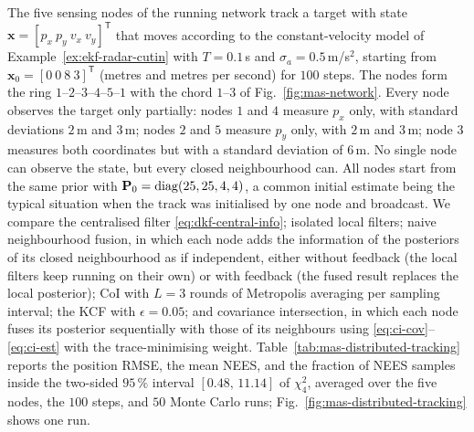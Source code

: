 \begin{example}
\label{ex:mas-distributed-tracking}
The five sensing nodes of the running network track a target with state $\mathbf{x}=[p_x\ p_y\ v_x\ v_y]^{\mathsf T}$ that moves according to the constant-velocity model of Example~\ref{ex:ekf-radar-cutin} with $T=0.1$\,s and $\sigma_a=0.5$\,m/s$^2$, starting from $\mathbf{x}_0=[0\ 0\ 8\ 3]^{\mathsf T}$ (metres and metres per second) for $100$ steps. The nodes form the ring $1$--$2$--$3$--$4$--$5$--$1$ with the chord $1$--$3$ of Fig.~\ref{fig:mas-network}. Every node observes the target only partially: nodes $1$ and $4$ measure $p_x$ only, with standard deviations $2$\,m and $3$\,m; nodes $2$ and $5$ measure $p_y$ only, with $2$\,m and $3$\,m; node $3$ measures both coordinates but with a standard deviation of $6$\,m. No single node can observe the state, but every closed neighbourhood can. All nodes start from the same prior with $\mathbf{P}_0=\operatorname{diag}(25,25,4,4)$, a common initial estimate being the typical situation when the track was initialised by one node and broadcast. We compare the centralised filter \eqref{eq:dkf-central-info}; isolated local filters; naive neighbourhood fusion, in which each node adds the information of the posteriors of its closed neighbourhood as if independent, either without feedback (the local filters keep running on their own) or with feedback (the fused result replaces the local posterior); CoI with $L=3$ rounds of Metropolis averaging per sampling interval; the KCF with $\epsilon=0.05$; and covariance intersection, in which each node fuses its posterior sequentially with those of its neighbours using \eqref{eq:ci-cov}--\eqref{eq:ci-est} with the trace-minimising weight. Table~\ref{tab:mas-distributed-tracking} reports the position RMSE, the mean NEES, and the fraction of NEES samples inside the two-sided $95\,\%$ interval $[0.48,\,11.14]$ of $\chi^{2}_{4}$, averaged over the five nodes, the $100$ steps, and $50$ Monte Carlo runs; Fig.~\ref{fig:mas-distributed-tracking} shows one run.


\end{example}
